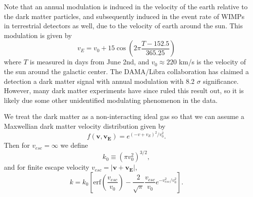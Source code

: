 Note that an annual modulation is induced in the velocity of the earth relative to the dark matter particles, and subsequently induced in the event rate of WIMPs in terrestrial detectors as well, due to the velocity of earth around the sun.  This modulation is given by 
\begin{equation}
v_E = v_0 + 15\cos \left(2\pi \frac{T - 152.5}{365.25} \right)
\end{equation}
where $T$ is measured in days from June 2nd, and $v_0 \approx 220$ km/s is the velocity of the sun around the galactic center. The DAMA/Libra collaboration has claimed a detection a dark matter signal with annual modulation with 8.2 $\sigma$ significance.  However, many dark matter experiments have since ruled this result out, so it is likely due some other unidentified modulating phenomenon in the data.

We treat the dark matter as a non-interacting ideal gas so that we can assume a Maxwellian dark matter velocity distribution given by
\begin{equation}
f(\mathbf{v},\mathbf{v_E})=e^{(-v+v_{E})^2/v_0^2}.
\end{equation}
Then for $v_{esc}=\infty$ we define
\begin{equation} \label{k-not}
k_0 \equiv (\pi v_0^2)^{3/2},
\end{equation}
and for finite escape velocity $v_{esc}=|\mathbf{v}+\mathbf{v_E}|$,
\begin{equation}
k=k_0 \left[\mbox{erf}(\frac{v_{esc}}{v_0}) - \frac{2}{\sqrt{\pi}} \frac{v_{esc}}{v_0} e^{-v_{esc}^2/v_0^2} \right].
\end{equation}


